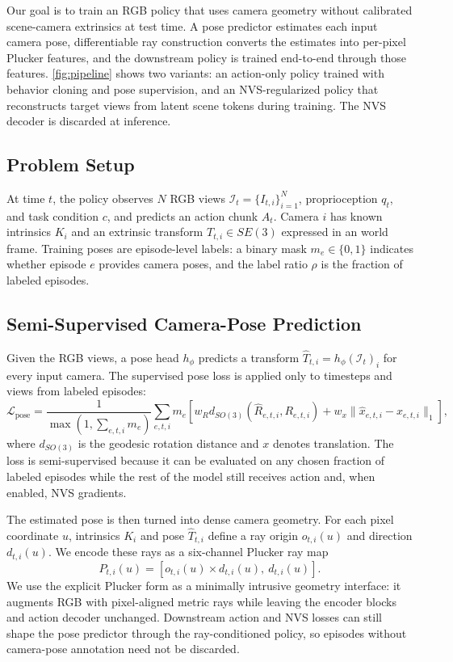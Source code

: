 Our goal is to train an RGB policy that uses camera geometry without calibrated
scene-camera extrinsics at test time.  A pose predictor estimates each input
camera pose, differentiable ray construction converts the estimates into
per-pixel Plucker features, and the downstream policy is trained end-to-end
through those features.  \autoref{fig:pipeline} shows two variants: an
action-only policy trained with behavior cloning and pose supervision, and an
NVS-regularized policy that reconstructs target views from latent scene tokens
during training.  The NVS decoder is discarded at inference.

\subsection{Problem Setup}

At time \(t\), the policy observes \(N\) RGB views
\(\mathcal{I}_t=\{I_{t,i}\}_{i=1}^{N}\), proprioception \(q_t\), and task
condition \(c\), and predicts an action chunk \(A_t\).  Camera \(i\) has known
intrinsics \(K_i\) and an extrinsic transform \(T_{t,i}\in SE(3)\) expressed in
an world frame.  Training poses are episode-level labels: a
binary mask \(m_e\in\{0,1\}\) indicates whether episode \(e\) provides camera
poses, and the label ratio \(\rho\) is the fraction of labeled episodes.

\subsection{Semi-Supervised Camera-Pose Prediction}

Given the RGB views, a pose head \(h_\phi\) predicts a transform
\(\hat{T}_{t,i}=h_\phi(\mathcal{I}_t)_i\) for every input camera.  The
supervised pose loss is applied only to timesteps and views from labeled
episodes:
\begin{equation}
\mathcal{L}_{\text{pose}} =
\frac{1}{\max(1,\sum_{e,t,i}m_e)}
\sum_{e,t,i}m_e
\left[
w_R d_{SO(3)}(\hat{R}_{e,t,i},R_{e,t,i})
+ w_x \|\hat{x}_{e,t,i}-x_{e,t,i}\|_1
\right],
\end{equation}
where \(d_{SO(3)}\) is the geodesic rotation distance and \(x\) denotes
translation.  The loss is semi-supervised because it can be evaluated on any
chosen fraction of labeled episodes while the rest of the model still
receives action and, when enabled, NVS gradients.

The estimated pose is then turned into dense camera geometry.  For each pixel
coordinate \(u\), intrinsics \(K_i\) and pose \(\hat{T}_{t,i}\) define a ray
origin \(o_{t,i}(u)\) and direction \(d_{t,i}(u)\).  We encode these rays as a
six-channel Plucker ray map~\citep{plucker1865newgeometry,sitzmann2021lfn}
\begin{equation}
P_{t,i}(u)=\left[o_{t,i}(u)\times d_{t,i}(u),\ d_{t,i}(u)\right].
\end{equation}
We use the explicit Plucker form as a minimally intrusive geometry interface:
it augments RGB with pixel-aligned metric rays while leaving the encoder blocks
and action decoder unchanged.  Downstream action and NVS losses can still shape
the pose predictor through the ray-conditioned policy, so episodes without
camera-pose annotation need not be discarded.

